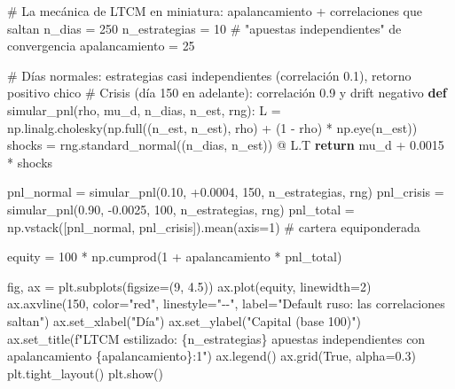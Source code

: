 \documentclass[
  spanish,
  letterpaper,
  DIV=11,
  numbers=noendperiod]{scrreprt}
\newenvironment{Shaded}{\begin{snugshade}}{\end{snugshade}}
\newcommand{\CommentTok}[1]{\textcolor[rgb]{0.37,0.37,0.37}{#1}}
\newcommand{\ControlFlowTok}[1]{\textcolor[rgb]{0.00,0.23,0.31}{\textbf{#1}}}
\newcommand{\DecValTok}[1]{\textcolor[rgb]{0.68,0.00,0.00}{#1}}
\newcommand{\FloatTok}[1]{\textcolor[rgb]{0.68,0.00,0.00}{#1}}
\newcommand{\KeywordTok}[1]{\textcolor[rgb]{0.00,0.23,0.31}{\textbf{#1}}}
\newcommand{\NormalTok}[1]{\textcolor[rgb]{0.00,0.23,0.31}{#1}}
\newcommand{\OperatorTok}[1]{\textcolor[rgb]{0.37,0.37,0.37}{#1}}
\newcommand{\SpecialCharTok}[1]{\textcolor[rgb]{0.37,0.37,0.37}{#1}}
\newcommand{\SpecialStringTok}[1]{\textcolor[rgb]{0.13,0.47,0.30}{#1}}
\newcommand{\StringTok}[1]{\textcolor[rgb]{0.13,0.47,0.30}{#1}}
\newcommand{\VariableTok}[1]{\textcolor[rgb]{0.07,0.07,0.07}{#1}}
\begin{document}
\begin{Shaded}
\begin{Highlighting}[]
\CommentTok{\# La mecánica de LTCM en miniatura: apalancamiento + correlaciones que saltan}
\NormalTok{n\_dias }\OperatorTok{=} \DecValTok{250}
\NormalTok{n\_estrategias }\OperatorTok{=} \DecValTok{10}          \CommentTok{\# "apuestas independientes" de convergencia}
\NormalTok{apalancamiento }\OperatorTok{=} \DecValTok{25}

\CommentTok{\# Días normales: estrategias casi independientes (correlación 0.1), retorno positivo chico}
\CommentTok{\# Crisis (día 150 en adelante): correlación 0.9 y drift negativo}
\KeywordTok{def}\NormalTok{ simular\_pnl(rho, mu\_d, n\_dias, n\_est, rng):}
\NormalTok{    L }\OperatorTok{=}\NormalTok{ np.linalg.cholesky(np.full((n\_est, n\_est), rho) }\OperatorTok{+}\NormalTok{ (}\DecValTok{1} \OperatorTok{{-}}\NormalTok{ rho) }\OperatorTok{*}\NormalTok{ np.eye(n\_est))}
\NormalTok{    shocks }\OperatorTok{=}\NormalTok{ rng.standard\_normal((n\_dias, n\_est)) }\OperatorTok{@}\NormalTok{ L.T}
    \ControlFlowTok{return}\NormalTok{ mu\_d }\OperatorTok{+} \FloatTok{0.0015} \OperatorTok{*}\NormalTok{ shocks}

\NormalTok{pnl\_normal }\OperatorTok{=}\NormalTok{ simular\_pnl(}\FloatTok{0.10}\NormalTok{, }\OperatorTok{+}\FloatTok{0.0004}\NormalTok{, }\DecValTok{150}\NormalTok{, n\_estrategias, rng)}
\NormalTok{pnl\_crisis }\OperatorTok{=}\NormalTok{ simular\_pnl(}\FloatTok{0.90}\NormalTok{, }\OperatorTok{{-}}\FloatTok{0.0025}\NormalTok{, }\DecValTok{100}\NormalTok{, n\_estrategias, rng)}
\NormalTok{pnl\_total }\OperatorTok{=}\NormalTok{ np.vstack([pnl\_normal, pnl\_crisis]).mean(axis}\OperatorTok{=}\DecValTok{1}\NormalTok{)  }\CommentTok{\# cartera equiponderada}

\NormalTok{equity }\OperatorTok{=} \DecValTok{100} \OperatorTok{*}\NormalTok{ np.cumprod(}\DecValTok{1} \OperatorTok{+}\NormalTok{ apalancamiento }\OperatorTok{*}\NormalTok{ pnl\_total)}

\NormalTok{fig, ax }\OperatorTok{=}\NormalTok{ plt.subplots(figsize}\OperatorTok{=}\NormalTok{(}\DecValTok{9}\NormalTok{, }\FloatTok{4.5}\NormalTok{))}
\NormalTok{ax.plot(equity, linewidth}\OperatorTok{=}\DecValTok{2}\NormalTok{)}
\NormalTok{ax.axvline(}\DecValTok{150}\NormalTok{, color}\OperatorTok{=}\StringTok{"red"}\NormalTok{, linestyle}\OperatorTok{=}\StringTok{"{-}{-}"}\NormalTok{, label}\OperatorTok{=}\StringTok{"Default ruso: las correlaciones saltan"}\NormalTok{)}
\NormalTok{ax.set\_xlabel(}\StringTok{"Día"}\NormalTok{)}
\NormalTok{ax.set\_ylabel(}\StringTok{"Capital (base 100)"}\NormalTok{)}
\NormalTok{ax.set\_title(}\SpecialStringTok{f"LTCM estilizado: }\SpecialCharTok{\{}\NormalTok{n\_estrategias}\SpecialCharTok{\}}\SpecialStringTok{ apuestas \textquotesingle{}independientes\textquotesingle{} con apalancamiento }\SpecialCharTok{\{}\NormalTok{apalancamiento}\SpecialCharTok{\}}\SpecialStringTok{:1"}\NormalTok{)}
\NormalTok{ax.legend()}
\NormalTok{ax.grid(}\VariableTok{True}\NormalTok{, alpha}\OperatorTok{=}\FloatTok{0.3}\NormalTok{)}
\NormalTok{plt.tight\_layout()}
\NormalTok{plt.show()}


\end{Highlighting}
\end{Shaded}
\end{document}
